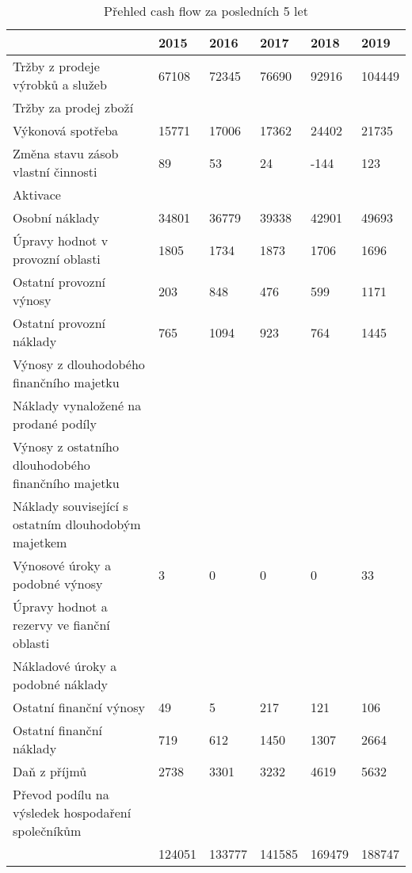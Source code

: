 \begin{table}[!hbtp]
\begin{tabular}{l|l|l|l|l|l|}
\cline{2-6}
 & 2015 & 2016 & 2017 & 2018 & 2019 \\ \hline
\multicolumn{1}{|l|}{Tržby z prodeje výrobků a služeb} & 67108 & 72345 & 76690 & 92916 & 104449 \\ \hline
\multicolumn{1}{|l|}{Tržby za prodej zboží} &  &  &  &  &  \\ \hline
\multicolumn{1}{|l|}{Výkonová spotřeba} & 15771 & 17006 & 17362 & 24402 & 21735 \\ \hline
\multicolumn{1}{|l|}{Změna stavu zásob vlastní činnosti} & 89 & 53 & 24 & -144 & 123 \\ \hline
\multicolumn{1}{|l|}{Aktivace} &  &  &  &  &  \\ \hline
\multicolumn{1}{|l|}{Osobní náklady} & 34801 & 36779 & 39338 & 42901 & 49693 \\ \hline
\multicolumn{1}{|l|}{Úpravy hodnot v provozní oblasti} & 1805 & 1734 & 1873 & 1706 & 1696 \\ \hline
\multicolumn{1}{|l|}{Ostatní provozní výnosy} & 203 & 848 & 476 & 599 & 1171 \\ \hline
\multicolumn{1}{|l|}{Ostatní provozní náklady} & 765 & 1094 & 923 & 764 & 1445 \\ \hline
\multicolumn{1}{|l|}{Výnosy z dlouhodobého finančního majetku} &  &  &  &  &  \\ \hline
\multicolumn{1}{|l|}{Náklady vynaložené na prodané podíly} &  &  &  &  &  \\ \hline
\multicolumn{1}{|l|}{Výnosy z ostatního dlouhodobého   finančního majetku} &  &  &  &  &  \\ \hline
\multicolumn{1}{|l|}{Náklady související s ostatním   dlouhodobým majetkem} &  &  &  &  &  \\ \hline
\multicolumn{1}{|l|}{Výnosové úroky a podobné výnosy} & 3 & 0 & 0 & 0 & 33 \\ \hline
\multicolumn{1}{|l|}{Úpravy hodnot a rezervy ve fianční   oblasti} &  &  &  &  &  \\ \hline
\multicolumn{1}{|l|}{Nákladové úroky a podobné náklady} &  &  &  &  &  \\ \hline
\multicolumn{1}{|l|}{Ostatní finanční výnosy} & 49 & 5 & 217 & 121 & 106 \\ \hline
\multicolumn{1}{|l|}{Ostatní finanční náklady} & 719 & 612 & 1450 & 1307 & 2664 \\ \hline
\multicolumn{1}{|l|}{Daň z příjmů} & 2738 & 3301 & 3232 & 4619 & 5632 \\ \hline
\multicolumn{1}{|l|}{Převod podílu na výsledek hospodaření   společníkům} &  &  &  &  &  \\ \hline
\rowcolor[HTML]{C0C0C0} 
\multicolumn{1}{|l|}{\cellcolor[HTML]{C0C0C0}Cash flow:} & 124051 & 133777 & 141585 & 169479 & 188747 \\ \hline
\end{tabular}
\caption[Přehled cash flow za posledních 5 let]{Přehled cash flow za posledních 5 let}
\end{table}

